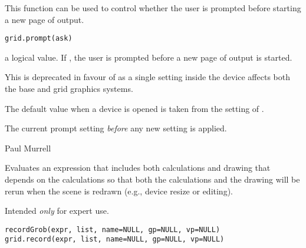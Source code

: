 %
\begin{Description}\relax
This function can be used to control whether the user
is prompted before starting a new page of output.
\end{Description}
%
\begin{Usage}
\begin{verbatim}
grid.prompt(ask)
\end{verbatim}
\end{Usage}
%
\begin{Arguments}
\begin{ldescription}
\item[\code{ask}]  a logical value.  If , the user
is prompted before a new page of output is started. 
\end{ldescription}
\end{Arguments}
%
\begin{Details}\relax
Yhis is deprecated in favour of  as a
single setting inside the device affects both the base and grid
graphics systems.

The default value when a device is opened is taken from the
setting of .
\end{Details}
%
\begin{Value}
The current prompt setting \emph{before} any new setting is applied.
\end{Value}
%
\begin{Author}\relax
 Paul Murrell 
\end{Author}
%
\begin{SeeAlso}\relax
\end{SeeAlso}
%
\begin{Description}\relax
Evaluates an expression that includes both calculations
and drawing that depends on the calculations so that
both the calculations and the drawing will be rerun when
the scene is redrawn (e.g., device resize or editing).

Intended \emph{only} for expert use.
\end{Description}
%
\begin{Usage}
\begin{verbatim}
recordGrob(expr, list, name=NULL, gp=NULL, vp=NULL)
grid.record(expr, list, name=NULL, gp=NULL, vp=NULL)
\end{verbatim}
\end{Usage}
